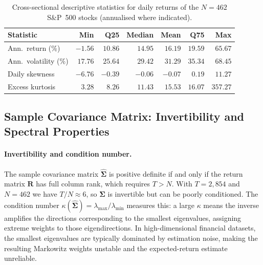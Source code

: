 \documentclass[11pt]{article}
\begin{document}
\begin{table}[ht]
\centering
\caption{Cross-sectional descriptive statistics for daily returns of the
  $N=462$ S\&P~500 stocks (annualised where indicated).}
\label{tab:descriptive}
\begin{tabular}{lrrrrrr}
\toprule
Statistic & Min & Q25 & Median & Mean & Q75 & Max \\
\midrule
Ann.\ return (\%)     & $-1.56$ & $10.86$ & $14.95$ & $16.19$ & $19.59$ & $65.67$ \\
Ann.\ volatility (\%) & $17.76$ & $25.64$ & $29.42$ & $31.29$ & $35.34$ & $68.45$ \\
Daily skewness        & $-6.76$ & $-0.39$ & $-0.06$ & $-0.07$ & $0.19$  & $11.27$ \\
Excess kurtosis       & $3.28$  & $8.26$  & $11.43$ & $15.53$ & $16.07$ & $357.27$ \\
\bottomrule
\end{tabular}
\end{table}

\subsection{Sample Covariance Matrix: Invertibility and Spectral Properties}
\label{sec:rmt}

\paragraph{Invertibility and condition number.}
The sample covariance matrix $\hat{\boldsymbol{\Sigma}}$ is positive definite if
and only if the return matrix $\mathbf{R}$ has full column rank, which requires
$T > N$.  With $T=2{,}854$ and $N=462$ we have $T/N\approx 6$, so
$\hat{\boldsymbol{\Sigma}}$ is invertible but can be poorly conditioned.  The
condition number $\kappa(\hat{\boldsymbol{\Sigma}})=\lambda_{\max}/\lambda_{\min}$
measures this: a large $\kappa$ means the inverse amplifies the directions
corresponding to the smallest eigenvalues, assigning extreme weights to those
eigendirections.  In high-dimensional financial datasets, the smallest eigenvalues
are typically dominated by estimation noise, making the resulting Markowitz
weights unstable and the expected-return estimate unreliable.
\end{document}

